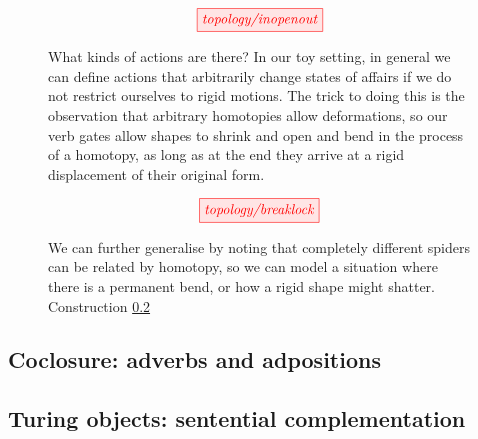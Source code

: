 \begin{figure}[h!]
\[\tikzfig{topology/inopenout}\]
\caption{What kinds of actions are there? In our toy setting, in general we can define actions that arbitrarily change states of affairs if we do not restrict ourselves to rigid motions. The trick to doing this is the observation that arbitrary homotopies allow deformations, so our verb gates allow shapes to shrink and open and bend in the process of a homotopy, as long as at the end they arrive at a rigid displacement of their original form.}
\end{figure}

\begin{figure}[h!]
\[\tikzfig{topology/breaklock}\]
\caption{
We can further generalise by noting that completely different spiders can be related by homotopy, so we can model a situation where there is a permanent bend, or how a rigid shape might shatter. Construction \ref{}
}
\end{figure}

\subsection{Coclosure: adverbs and adpositions}



\subsection{Turing objects: sentential complementation}

